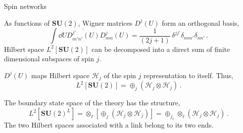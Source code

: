 \documentclass{beamer}
\begin{document}
\begin{frame}{Spin networks}
    \begin{list}{\maltese}{\leftmargin=1em \itemindent=0em}
        \item<1-> As functions of $\mathbf{SU}(2)$, Wigner matrices $D^j(U)$ form an orthogonal basis,
        \begin{equation}
            \int\dd{U}\overline{D^{j'}_{m'n'}(U)}D^{j}_{mn}(U)=\frac{1}{(2j+1)}\, \delta^{jj'}\delta_{mm'}\delta_{nn'}\,.
        \end{equation}
        Hilbert space $L^2[{\mathbf{SU}(2)}]$ can be decomposed into a direct sum of finite dimensional subspaces of spin $j$.
        \item<2-> $D^j(U)$ maps Hilbert space $\mathcal{H}_j$ of the spin $j$ representation to itself. Thus,
        \begin{equation}
            L^2[{\mathbf{SU}(2)}]=\oplus_j(\mathcal{H}_j\otimes\mathcal{H}_j)\,.
        \end{equation}
        \item<3-> The boundary state space of the theory has the structure,
        \begin{equation}
            L^2[{\mathbf{SU}(2)}^L]=\otimes_\ell\left[\oplus_j(\mathcal{H}_j\otimes\mathcal{H}_j)\right]=\oplus_{j_\ell}\otimes_\ell(\mathcal{H}_j\otimes\mathcal{H}_j)\,.
        \end{equation}
        The two Hilbert spaces associated with a link belong to its two ends.
    \end{list}
\end{frame}
\end{document}
